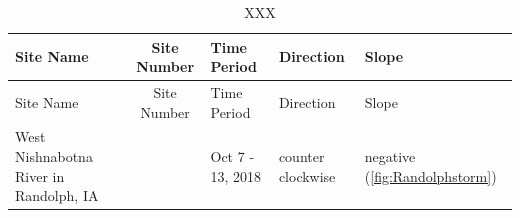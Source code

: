 \documentclass[12pt,]{article}
\begin{document}
\begin{longtable}[]{@{}lclll@{}}
\caption{XXX}\tabularnewline
\toprule
\begin{minipage}[b]{0.15\columnwidth}\raggedright
Site Name\strut
\end{minipage} & \begin{minipage}[b]{0.22\columnwidth}\centering
Site Number\strut
\end{minipage} & \begin{minipage}[b]{0.20\columnwidth}\raggedright
Time Period\strut
\end{minipage} & \begin{minipage}[b]{0.17\columnwidth}\raggedright
Direction\strut
\end{minipage} & \begin{minipage}[b]{0.12\columnwidth}\raggedright
Slope\strut
\end{minipage}\tabularnewline
\midrule
\endfirsthead
\toprule
\begin{minipage}[b]{0.15\columnwidth}\raggedright
Site Name\strut
\end{minipage} & \begin{minipage}[b]{0.22\columnwidth}\centering
Site Number\strut
\end{minipage} & \begin{minipage}[b]{0.20\columnwidth}\raggedright
Time Period\strut
\end{minipage} & \begin{minipage}[b]{0.17\columnwidth}\raggedright
Direction\strut
\end{minipage} & \begin{minipage}[b]{0.12\columnwidth}\raggedright
Slope\strut
\end{minipage}\tabularnewline
\midrule
\endhead
\begin{minipage}[t]{0.15\columnwidth}\raggedright
West Nishnabotna River in Randolph, IA\strut
\end{minipage} & \begin{minipage}[t]{0.22\columnwidth}\centering
06808500\strut
\end{minipage} & \begin{minipage}[t]{0.20\columnwidth}\raggedright
Oct 7 - 13, 2018\strut
\end{minipage} & \begin{minipage}[t]{0.17\columnwidth}\raggedright
counter clockwise\strut
\end{minipage} & \begin{minipage}[t]{0.12\columnwidth}\raggedright
negative (\autoref{fig:Randolphstorm})\strut

\end{minipage}
\end{longtable}
\end{document}
